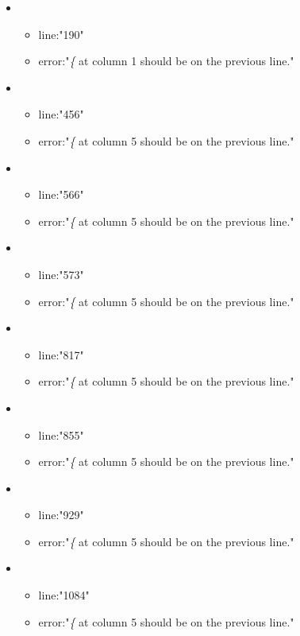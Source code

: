 \begin{itemize}
	\item 
	\begin{itemize} 
		\item line:"190" 
		\item error:"\emph{\{} at column 1 should be on the previous line." 
	\end{itemize}
	\item 
	\begin{itemize} 
		\item line:"456" 
		\item error:"\emph{\{} at column 5 should be on the previous line." 
	\end{itemize}
	\item 
	\begin{itemize} 
		\item line:"566" 
		\item error:"\emph{\{} at column 5 should be on the previous line." 
	\end{itemize}
	\item 
	\begin{itemize} 
		\item line:"573" 
		\item error:"\emph{\{} at column 5 should be on the previous line." 
	\end{itemize}
	\item 
	\begin{itemize} 
		\item line:"817" 
		\item error:"\emph{\{} at column 5 should be on the previous line." 
	\end{itemize}
	\item 
	\begin{itemize} 
		\item line:"855" 
		\item error:"\emph{\{} at column 5 should be on the previous line." 
	\end{itemize}
	\item 
	\begin{itemize} 
		\item line:"929" 
		\item error:"\emph{\{} at column 5 should be on the previous line." 
	\end{itemize}
	\item 
	\begin{itemize} 
		\item line:"1084" 
		\item error:"\emph{\{} at column 5 should be on the previous line." 

\end{itemize}
\end{itemize}
